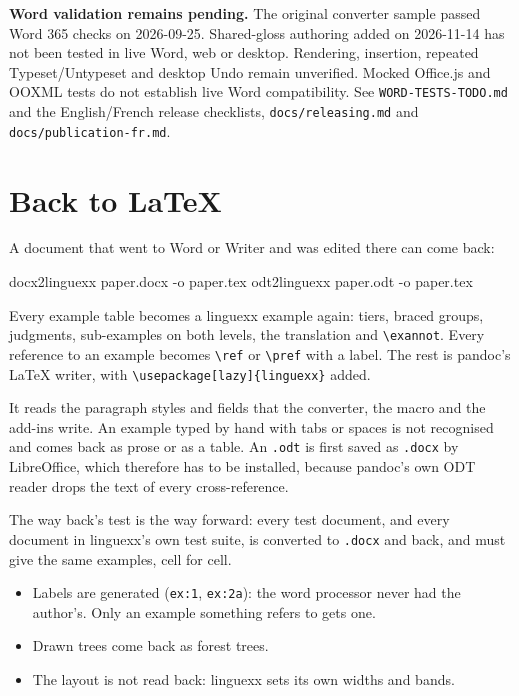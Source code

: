 \documentclass[11pt,a4paper]{article}
\newcommand{\cs}[1]{\texttt{\textbackslash #1}}
\newcommand{\file}[1]{\texttt{#1}}
\newcommand{\pkg}[1]{\textsf{#1}}
\begin{document}
\textbf{Word validation remains pending.} The original converter sample
passed Word 365 checks on 2026-09-25. Shared-gloss authoring added on
2026-11-14 has not been tested in live Word, web or desktop. Rendering,
insertion, repeated Typeset/Untypeset and desktop Undo remain unverified.
Mocked Office.js and OOXML tests do not establish live Word compatibility.
See \file{WORD-TESTS-TODO.md} and the English/French release checklists,
\file{docs/releasing.md} and \file{docs/publication-fr.md}.

\section{Back to \LaTeX}\label{sec:back}

A document that went to Word or Writer and was edited there can come back:
\begin{code}
docx2linguexx paper.docx -o paper.tex
odt2linguexx  paper.odt  -o paper.tex
\end{code}
Every example table becomes a \pkg{linguexx} example again: tiers, braced
groups, judgments, sub-examples on both levels, the translation and
\cs{exannot}. Every reference to an example becomes \cs{ref} or \cs{pref}
with a label. The rest is pandoc's \LaTeX{} writer, with
\texttt{\cs{usepackage}[lazy]\{linguexx\}} added.

It reads the paragraph styles and fields that the converter, the macro and the
add-ins write. An example typed by hand with tabs or spaces is not recognised
and comes back as prose or as a table. An \file{.odt} is first saved as
\file{.docx} by LibreOffice, which therefore has to be installed, because
pandoc's own ODT reader drops the text of every cross-reference.

The way back's test is the way forward: every test document, and every
document in \pkg{linguexx}'s own test suite, is converted to \file{.docx} and
back, and must give the same examples, cell for cell.

\begin{itemize}
\item Labels are generated (\texttt{ex:1}, \texttt{ex:2a}): the word processor
  never had the author's. Only an example something refers to gets one.
\item Drawn trees come back as \pkg{forest} trees.
\item The layout is not read back: \pkg{linguexx} sets its own widths and
  bands.
\end{itemize}
\end{document}
